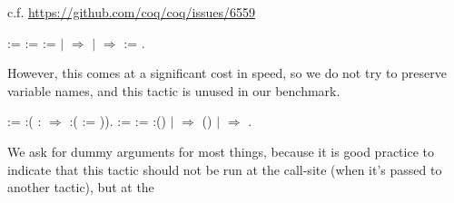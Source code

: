     c.f. \url{https://github.com/coq/coq/issues/6559} \begin{coqdoccode}
\coqdocemptyline
\coqdocnoindent
{}    :=\coqdoceol
\coqdocindent{1.00em}
  :=   \coqdoceol
\coqdocindent{1.00em}
  :=   \coqdoceol
\coqdocindent{6.00em}
\ensuremath{|}  \ensuremath{\Rightarrow} \coqdoceol
\coqdocindent{6.00em}
\ensuremath{|}  \ensuremath{\Rightarrow}  \coqdoceol
\coqdocindent{6.00em}
 \coqdoceol
\coqdocindent{1.00em}
  :=   \coqdoceol
\coqdocindent{1.00em}
.\coqdoceol
\coqdocemptyline
\end{coqdoccode}
However, this comes at a significant cost in speed, so we do not
    try to preserve variable names, and this tactic is unused in our
    benchmark. \begin{coqdoccode}
\coqdocemptyline
\coqdocnoindent
{}    :=\coqdoceol
\coqdocindent{1.00em}
:(  :  \ensuremath{\Rightarrow} :(  :=      )).\coqdoceol
\coqdocemptyline
\coqdocnoindent
{}   :=\coqdoceol
\coqdocindent{1.00em}
  := :() \coqdoceol
\coqdocindent{1.00em}
  \coqdoceol
\coqdocindent{1.00em}
\ensuremath{|}  \ensuremath{\Rightarrow}  ()\coqdoceol
\coqdocindent{1.00em}
\ensuremath{|}  \ensuremath{\Rightarrow} \coqdoceol
\coqdocindent{1.00em}
.\coqdoceol
\coqdocemptyline
\end{coqdoccode}
We ask for dummy arguments for most things, because it is good
    practice to indicate that this tactic should not be run at the
    call-site (when it's passed to another tactic), but at the
